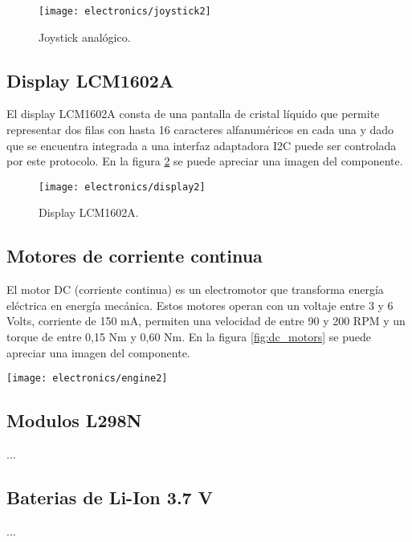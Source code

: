 \begin{figure}[h]
    \centering
    \texttt{[image: electronics/joystick2]}
    \caption{Joystick analógico.}
    \label{fig:joystick}
\end{figure}


\subsection{Display LCM1602A}
El display LCM1602A \cite{LCM1602A_datasheet} consta de una pantalla de cristal líquido que permite representar dos filas con hasta 16 caracteres alfanuméricos en cada una y dado que se encuentra integrada a una interfaz adaptadora I2C puede ser controlada por este protocolo. En la figura \ref{fig:display} se puede apreciar una imagen del componente.

\begin{figure}[h]
    \centering
    \texttt{[image: electronics/display2]}
    \caption{Display LCM1602A.}
    \label{fig:display}
\end{figure}

\subsection{Motores de corriente continua}
El motor DC (corriente continua) \cite{dc_motor_datasheet} es un electromotor que transforma energía eléctrica en energía mecánica. Estos motores operan con un voltaje entre 3 y 6 Volts, corriente de 150 mA, permiten una velocidad de entre 90 y 200 RPM y un torque de entre 0,15 Nm y 0,60 Nm. En la figura \ref{fig:dc_motors} se puede apreciar una imagen del componente.


\begin{center}
  \texttt{[image: electronics/engine2]}
    \label{fig:dc_motors}
\end{center}
  


\subsection{Modulos L298N}
...

\subsection{Baterias de Li-Ion 3.7 V}
...

